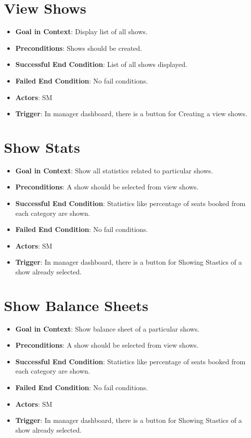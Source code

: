 \documentclass{scrreprt}
\begin{document}
\section{View Shows}
\begin{itemize}
\item \textbf{Goal in Context}: Display list of all shows.
\item \textbf{Preconditions}: Shows should be created.
\item \textbf{Successful End Condition}: List of all shows displayed.
\item \textbf{Failed End Condition}: No fail conditions.
\item \textbf{Actors}: SM
\item \textbf{Trigger}: In manager dashboard, there is a button for Creating a view shows.
\end{itemize}

\section{Show Stats}
\begin{itemize}
\item \textbf{Goal in Context}: Show all statistics related to particular shows.
\item \textbf{Preconditions}: A show should be selected from view shows.
\item \textbf{Successful End Condition}: Statistics like percentage of seats booked from each category are shown.
\item \textbf{Failed End Condition}: No fail conditions.
\item \textbf{Actors}: SM
\item \textbf{Trigger}: In manager dashboard, there is a button for Showing Stastics of a show already selected.
\end{itemize}

\section{Show Balance Sheets}
\begin{itemize}
\item \textbf{Goal in Context}: Show balance sheet of a particular shows.
\item \textbf{Preconditions}: A show should be selected from view shows.
\item \textbf{Successful End Condition}: Statistics like percentage of seats booked from each category are shown.
\item \textbf{Failed End Condition}: No fail conditions.
\item \textbf{Actors}: SM
\item \textbf{Trigger}: In manager dashboard, there is a button for Showing Stastics of a show already selected.
\end{itemize}
\end{document}
